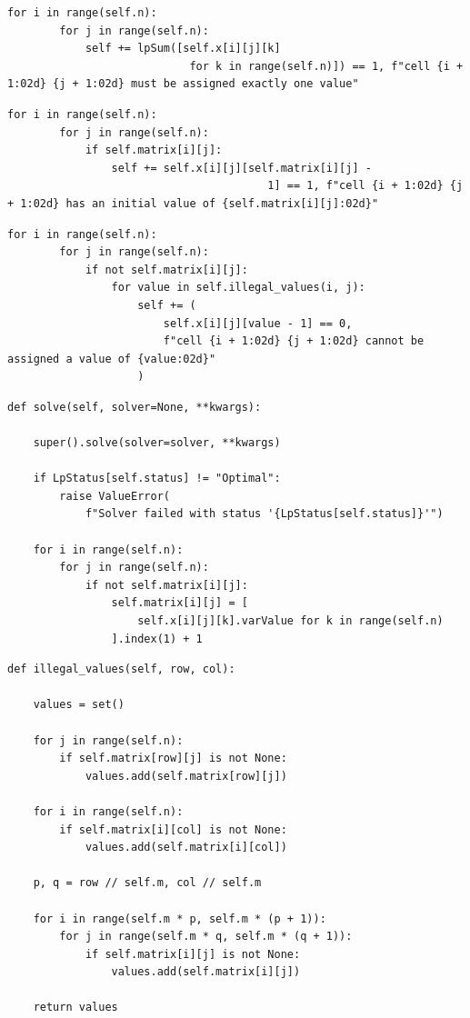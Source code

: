 \documentclass[12pt]{article}
\begin{document}
\begin{lstlisting}[caption={TODO}]
    for i in range(self.n):
        for j in range(self.n):
            self += lpSum([self.x[i][j][k]
                            for k in range(self.n)]) == 1, f"cell {i + 1:02d} {j + 1:02d} must be assigned exactly one value"
\end{lstlisting}

\begin{lstlisting}[caption={TODO}]
    for i in range(self.n):
        for j in range(self.n):
            if self.matrix[i][j]:
                self += self.x[i][j][self.matrix[i][j] -
                                        1] == 1, f"cell {i + 1:02d} {j + 1:02d} has an initial value of {self.matrix[i][j]:02d}"
\end{lstlisting}

\begin{lstlisting}[caption={TODO}]
    for i in range(self.n):
        for j in range(self.n):
            if not self.matrix[i][j]:
                for value in self.illegal_values(i, j):
                    self += (
                        self.x[i][j][value - 1] == 0,
                        f"cell {i + 1:02d} {j + 1:02d} cannot be assigned a value of {value:02d}"
                    )
\end{lstlisting}

\begin{lstlisting}[caption={TODO}]
def solve(self, solver=None, **kwargs):

    super().solve(solver=solver, **kwargs)

    if LpStatus[self.status] != "Optimal":
        raise ValueError(
            f"Solver failed with status '{LpStatus[self.status]}'")

    for i in range(self.n):
        for j in range(self.n):
            if not self.matrix[i][j]:
                self.matrix[i][j] = [
                    self.x[i][j][k].varValue for k in range(self.n)
                ].index(1) + 1
\end{lstlisting}

\begin{lstlisting}[caption={TODO}]
def illegal_values(self, row, col):

    values = set()

    for j in range(self.n):
        if self.matrix[row][j] is not None:
            values.add(self.matrix[row][j])

    for i in range(self.n):
        if self.matrix[i][col] is not None:
            values.add(self.matrix[i][col])

    p, q = row // self.m, col // self.m

    for i in range(self.m * p, self.m * (p + 1)):
        for j in range(self.m * q, self.m * (q + 1)):
            if self.matrix[i][j] is not None:
                values.add(self.matrix[i][j])

    return values
\end{lstlisting}
\end{document}
